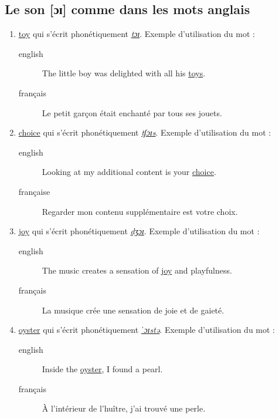 \documentclass[12pt,a4paper]{book}
\begin{document}
\subsection{Le son [ɔɪ] comme dans les mots anglais}
\label{sec:org4d2fca6}
\begin{enumerate}
\item \href{http://www.wordreference.com/enfr/toy}{toy} qui s'écrit phonétiquement \href{https://en.oxforddictionaries.com/definition/toy}{\emph{tɔɪ}}. Exemple d'utilisation du mot :
\begin{description}
\item[{english}] \textenglish{The little boy was delighted with all his \href{https://youtu.be/1qbuZhVUj\_g}{toys}.}
\item[{français}] Le petit garçon était enchanté par tous ses jouets.
\end{description}
\item \href{http://www.wordreference.com/enfr/choice}{choice} qui s'écrit phonétiquement \href{https://en.oxforddictionaries.com/definition/choice}{\emph{tʃɔɪs}}. Exemple d'utilisation du mot :
\begin{description}
\item[{english}] \textenglish{Looking at my additional content is your \href{https://youtu.be/qBfeK\_IIHag}{choice}.}
\item[{française}] Regarder mon contenu supplémentaire est votre choix.
\end{description}
\item \href{http://www.wordreference.com/enfr/joy}{joy} qui s'écrit phonétiquement \href{https://en.oxforddictionaries.com/definition/joy}{\emph{dʒɔɪ}}. Exemple d'utilisation du mot :
\begin{description}
\item[{english}] \textenglish{The music creates a sensation of \href{https://youtu.be/-GjW1pSYgUk}{joy} and playfulness.}
\item[{français}] La musique crée une sensation de joie et de gaieté.
\end{description}
\item \href{http://www.wordreference.com/enfr/oyster}{oyster} qui s'écrit phonétiquement \href{https://en.oxforddictionaries.com/definition/oyster}{\emph{ˈɔɪstə}}. Exemple d'utilisation du mot :
\begin{description}
\item[{english}] \textenglish{Inside the \href{https://youtu.be/PVn6b9QQZeM}{oyster}, I found a pearl.}
\item[{français}] À l'intérieur de l'huître, j'ai trouvé une perle.
\end{description}
\end{enumerate}
\end{document}
